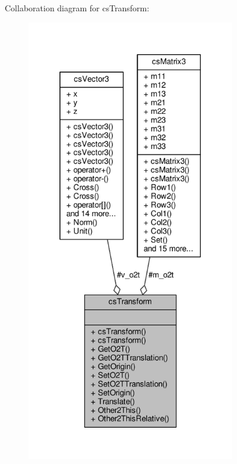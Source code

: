 Collaboration diagram for cs\+Transform\+:
\nopagebreak
\begin{figure}[H]
\begin{center}
\leavevmode
\includegraphics[height=550pt]{d4/d50/classcsTransform__coll__graph}
\end{center}
\end{figure}
